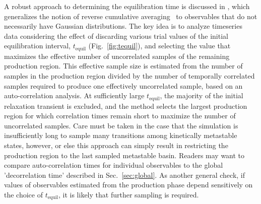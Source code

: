 
A robust approach to determining the equilibration time is discussed in \cite{Chodera-2016}, which generalizes the notion of reverse cumulative averaging~\cite{Yang2004} to observables that do not necessarily have Gaussian distributions.
The key idea is to analyze timeseries data considering the effect of discarding various trial values of the initial equilibration interval, $t_{\mathrm{equil}}$ (Fig.\ \ref{fig:tequil}), and selecting the value that maximizes the effective number of uncorrelated samples of the remaining production region.
This effective sample size is estimated from the number of samples in the production region divided by the number of temporally correlated samples required to produce one effectively uncorrelated sample, based on an auto-correlation analysis.
At sufficiently large $t_{\mathrm{equil}}$, the majority of the initial relaxation transient is excluded, and the method selects the largest production region for which correlation times remain short to maximize the number of uncorrelated samples.
Care must be taken in the case that the simulation is insufficiently long to sample many transitions among kinetically metastable states, however, or else this approach can simply result in restricting the production region to the last sampled metastable basin.
Readers may want to compare auto-correlation times for individual observables to the global 'decorrelation time' \cite{Lyman2007a} described in Sec.\ \ref{sec:global}.  
As another general check, if values of observables estimated from the production phase depend sensitively on the choice of $t_{\mathrm{equil}}$, it is likely that further sampling is required.


